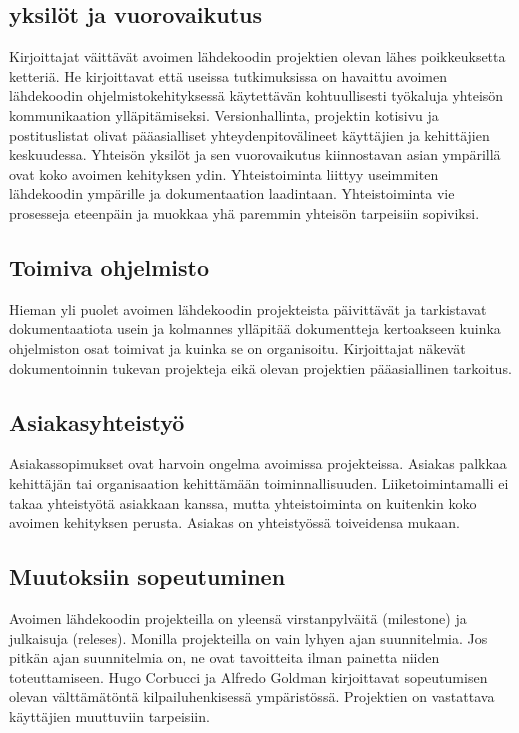 \documentclass[finnish]{tktltiki2}
\theoremstyle{definition}
\theoremstyle{remark}
\begin{document}
\subsection{yksilöt ja vuorovaikutus}

Kirjoittajat väittävät avoimen lähdekoodin projektien olevan lähes poikkeuksetta ketteriä. He kirjoittavat että useissa tutkimuksissa on havaittu avoimen lähdekoodin ohjelmistokehityksessä käytettävän kohtuullisesti työkaluja yhteisön kommunikaation ylläpitämiseksi. Versionhallinta, projektin kotisivu ja postituslistat olivat pääasialliset yhteydenpitovälineet käyttäjien ja kehittäjien keskuudessa. 
Yhteisön yksilöt ja sen vuorovaikutus kiinnostavan asian ympärillä ovat koko avoimen kehityksen ydin. Yhteistoiminta liittyy useimmiten lähdekoodin ympärille ja dokumentaation laadintaan. Yhteistoiminta vie prosesseja eteenpäin ja muokkaa yhä paremmin yhteisön tarpeisiin sopiviksi. 

\subsection{Toimiva ohjelmisto}

Hieman yli puolet avoimen lähdekoodin projekteista päivittävät ja tarkistavat dokumentaatiota usein ja kolmannes ylläpitää dokumentteja kertoakseen kuinka ohjelmiston osat toimivat ja kuinka se on organisoitu. Kirjoittajat näkevät dokumentoinnin tukevan projekteja eikä olevan projektien pääasiallinen tarkoitus.

\subsection{Asiakasyhteistyö}

Asiakassopimukset ovat harvoin ongelma avoimissa projekteissa. Asiakas palkkaa kehittäjän tai organisaation kehittämään toiminnallisuuden. Liiketoimintamalli ei takaa yhteistyötä asiakkaan kanssa, mutta yhteistoiminta on kuitenkin koko avoimen kehityksen perusta. Asiakas on yhteistyössä toiveidensa mukaan.

\subsection{Muutoksiin sopeutuminen}

Avoimen lähdekoodin projekteilla on yleensä virstanpylväitä (milestone) ja julkaisuja (releses). Monilla projekteilla on vain lyhyen ajan suunnitelmia. Jos pitkän ajan suunnitelmia on, ne ovat tavoitteita ilman painetta niiden toteuttamiseen. Hugo Corbucci ja Alfredo Goldman kirjoittavat sopeutumisen olevan välttämätöntä kilpailuhenkisessä ympäristössä. Projektien on vastattava käyttäjien muuttuviin tarpeisiin.
\end{document}

